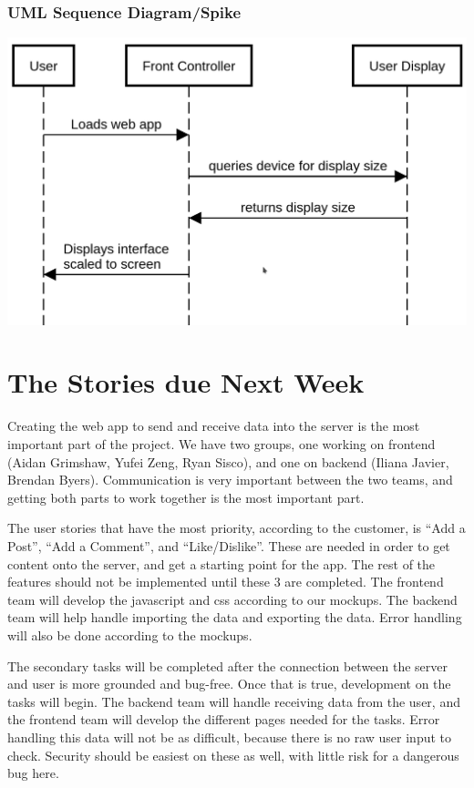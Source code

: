\documentclass[12pt]{article}
\begin{document}
\subsubsection{UML Sequence Diagram/Spike}
\includegraphics[scale=0.5]{img/responsive_web_page.png}\linebreak


\section{The Stories due Next Week}

Creating the web app to send and receive data into the server is the most
important part of the project. We have two groups, one working on frontend
(Aidan Grimshaw, Yufei Zeng, Ryan Sisco), and one on backend (Iliana Javier,
Brendan Byers). Communication is very important between the two teams, and
getting both parts to work together is the most important part.

The user stories that have the most priority, according to the customer, is “Add
a Post”, “Add a Comment”, and  “Like/Dislike”. These are needed in order to get
content onto the server, and get a starting point for the app. The rest of the
features should not be implemented until these 3 are completed. The frontend
team will develop the javascript and css according to our mockups. The backend
team will help handle importing the data and exporting the data. Error handling
will also be done according to the mockups.

The secondary tasks will be completed after the connection between the server
and user is more grounded and bug-free. Once that is true, development on the
tasks will begin. The backend team will handle receiving data from the user, and
the frontend team will develop the different pages needed for the tasks. Error
handling this data will not be as difficult, because there is no raw user input
to check. Security should be easiest on these as well, with little risk for a
dangerous bug here.
\end{document}
